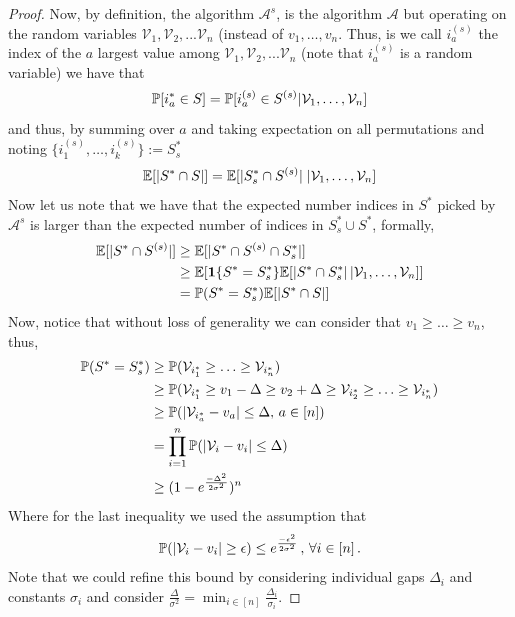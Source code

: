 \begin{proof}
Now, by definition, the algorithm $\mathcal{A}^{s}$, is the algorithm $\mathcal{A}$ but operating on the random variables $\mathcal{V}_1, \mathcal{V}_2, ...\mathcal{V}_n$ (instead of $v_1,\ldots, v_n$. Thus, is we call $i_a^{(s)}$ the index of the $a$ largest value among  $\mathcal{V}_1, \mathcal{V}_2, ...\mathcal{V}_n$ (note that $i_a^{(s)}$ is a random variable) we have that 
\begin{equation}
   {\mathbb{P}}[i_a^* \in S] = {\mathbb{P}}[i_a^{(s)} \in S^{(s)}|\mathcal{V}_1, \dots,\mathcal{V}_n]
\end{equation}
and thus, by summing over $a$ and taking expectation on all permutations and noting $\{i_1^{(s)},\ldots,i_k^{(s)}\} := S^*_s$
\begin{equation}
    {\mathbb{E}}[|S^* \cap S|] = {\mathbb{E}}[|S^*_s \cap S^{(s)}|  \; | \mathcal{V}_1, \ldots,\mathcal{V}_n]
\end{equation}
Now let us note that 
we have that the expected number indices in $S^*$ picked by $\mathcal{A}^{s}$ is larger than the expected number of indices in $S^*_s\cup S^*$, formally,
\begin{align}
    {\mathbb{E}}[|S^* \cap S^{(s)}|]  \notag
    &\geq {\mathbb{E}}[|S^* \cap S^{(s)} \cap S^*_s|] \notag \\
    &\geq {\mathbb{E}} [ \mathbf{1}\{S^* = S^*_s\} {\mathbb{E}}[|S^* \cap S^*_s|\,| \mathcal{V}_1, \ldots,\mathcal{V}_n]] \notag\\
    &= {\mathbb{P}}(S^*=S^*_s) {\mathbb{E}}[|S^* \cap S|]
\end{align}
Now, notice that without loss of generality we can consider that $v_1 \geq \dots \geq v_n$, thus,  
\begin{align*}
    {\mathbb{P}}(S^*=S^*_s) 
    &\geq {\mathbb{P}}(\mathcal{V}_{i_1^*} \geq \ldots \geq \mathcal{V}_{i_n^*})  \\
    & \geq {\mathbb{P}}(\mathcal{V}_{i_1^*} \geq v_1 - \Delta  \geq  v_2 + \Delta \geq \mathcal{V}_{i_2^*} \geq \ldots \geq  \mathcal{V}_{i_n^*}) \\
     & \geq {\mathbb{P}}(|\mathcal{V}_{i_a^*} - v_a| \leq  \Delta, \,a \in [n]) \\
    & = \prod_{i=1}^n{\mathbb{P}}( |\mathcal{V}_i-v_i| \leq \Delta) \\
    & \geq (1 - e^{\frac{-\Delta^2}{2\sigma^2}})^{n}
\end{align*}
Where for the last inequality we used the assumption that 
\begin{equation}
    {\mathbb{P}}( |\mathcal{V}_i-v_i| \geq \epsilon) \leq e^{\frac{-\epsilon^2}{2\sigma^2}} \,,\,\forall i \in [n]\,.
\end{equation} 
Note that we could refine this bound by considering individual gaps $\Delta_i$ and constants $\sigma_i$ and consider $\frac{\Delta}{\sigma^2} = \min_{i \in [n]} \frac{\Delta_i}{\sigma_i}$.

\end{proof}


